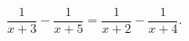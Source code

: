 \begin{ex}[type=equation]
	\begin{condition}
		$\dfrac{1}{x + 3} - \dfrac{1}{x + 5} = \dfrac{1}{x + 2} - \dfrac{1}{x + 4}.$
	\end{condition}
\end{ex}